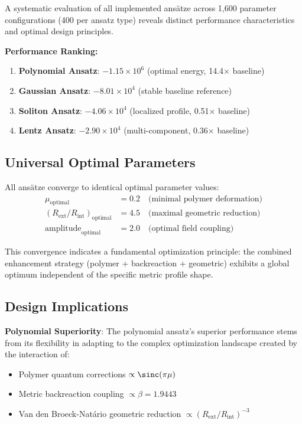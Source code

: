 \documentclass[12pt,a4paper]{article}
\begin{document}
A systematic evaluation of all implemented ansätze across 1,600 parameter configurations (400 per ansatz type) reveals distinct performance characteristics and optimal design principles.

\textbf{Performance Ranking:}
\begin{enumerate}
\item \textbf{Polynomial Ansatz}: $-1.15 \times 10^6$ (optimal energy, 14.4× baseline)
\item \textbf{Gaussian Ansatz}: $-8.01 \times 10^4$ (stable baseline reference)
\item \textbf{Soliton Ansatz}: $-4.06 \times 10^4$ (localized profile, 0.51× baseline)
\item \textbf{Lentz Ansatz}: $-2.90 \times 10^4$ (multi-component, 0.36× baseline)
\end{enumerate}

\subsection{Universal Optimal Parameters}

All ansätze converge to identical optimal parameter values:
\begin{align}
\mu_{\text{optimal}} &= 0.2 \quad \text{(minimal polymer deformation)} \\
(R_{\text{ext}}/R_{\text{int}})_{\text{optimal}} &= 4.5 \quad \text{(maximal geometric reduction)} \\
\text{amplitude}_{\text{optimal}} &= 2.0 \quad \text{(optimal field coupling)}
\end{align}

This convergence indicates a fundamental optimization principle: the combined enhancement strategy (polymer + backreaction + geometric) exhibits a global optimum independent of the specific metric profile shape.

\subsection{Design Implications}

\textbf{Polynomial Superiority}: The polynomial ansatz's superior performance stems from its flexibility in adapting to the complex optimization landscape created by the interaction of:
\begin{itemize}
\item Polymer quantum corrections $\propto \sinc(\pi\mu)$
\item Metric backreaction coupling $\propto \beta = 1.9443$
\item Van den Broeck-Natário geometric reduction $\propto (R_{\text{ext}}/R_{\text{int}})^{-3}$
\end{itemize}
\end{document}
